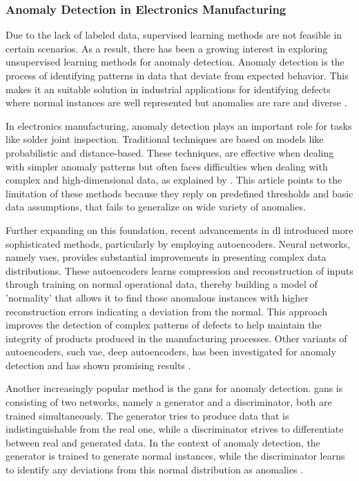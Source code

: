 \subsubsection{Anomaly Detection in Electronics Manufacturing}

Due to the lack of labeled data, supervised learning methods are not feasible in certain scenarios. As a result, there has been a growing interest in exploring unsupervised learning methods for anomaly detection. Anomaly detection is the process of identifying patterns in data that deviate from expected behavior. This makes it an suitable solution in industrial applications for identifying defects where normal instances are well represented but anomalies are rare and diverse \cite{10.1145/1541880.1541882}.

In electronics manufacturing, anomaly detection plays an important role for tasks like solder joint inspection. Traditional techniques are based on models like probabilistic and distance-based. These techniques, are effective when dealing with simpler anomaly patterns but often faces difficulties when dealing with complex and high-dimensional data, as explained by \cite{PIMENTEL2014215}. This article points to the limitation of these methods because they reply on predefined thresholds and basic data assumptions, that fails to generalize on wide variety of anomalies.

Further expanding on this foundation, recent advancements in \gls{dl} introduced more sophisticated methods, particularly by employing autoencoders\cite{bank2021autoencoders}. Neural networks, namely \glspl{vae}\cite{Kingma_2019}, provides substantial improvements in presenting complex data distributions. These autoencoders learns compression and reconstruction of inputs through training on normal operational data, thereby building a model of 'normality' that allows it to find those anomalous instances with higher reconstruction errors indicating a deviation from the normal\cite{bank2021autoencoders}. This approach improves the detection of complex patterns of defects to help maintain the integrity of products produced in the manufacturing processes. Other variants of autoencoders, such \gls{vae}, deep autoencoders, has been investigated for anomaly detection and has shown promising results \cite{Kingma_2019}.

Another increasingly popular method is the \glspl{gan}\cite{goodfellow2014generativeadversarialnetworks} for anomaly detection. \glspl{gan} is consisting of two networks, namely a generator and a discriminator, both are trained simultaneously. The generator tries to produce data that is indistinguishable from the real one, while a discriminator strives to differentiate between real and generated data. In the context of anomaly detection, the generator is trained to generate normal instances, while the discriminator learns to identify any deviations from this normal distribution as anomalies \cite{schlegl2017unsupervisedanomalydetectiongenerative}.

